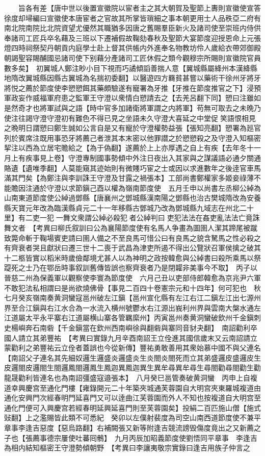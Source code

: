 　　旨各有差【唐中世以後置宣徽院以宦者主之其大朝賀及聖節上夀則宣徽使宣答徐度却埽編曰宣徽使本唐宦者之官故其所掌皆瑣細之事本朝更用士人品秩亞二府有南北院南院比北院資望尤優然其職猶多因唐之舊賜羣臣新火及諸司使至崇班内侍供奉諸司工匠兵卒名藉及三班以下遷補假故鞠劾春秋及聖節大宴節度迎授恩命上元張燈四時祠祭契丹朝貢内庭學士赴上督其供帳内外進奉名物教坊伶人歲給衣帶郊御殿朝謁聖容賜酺國忌諸司使下别藉分產諸司工匠休假之類今觀穆宗所賜則宣徽院官員數多矣】　初翼城人鄭注眇小目下視而巧譎傾謟善揣人意【翼城縣屬絳州本漢絳縣地隋改翼城縣因縣古翼城為名揣初委翻】以醫遊四方羇貧甚嘗以藥術干徐州牙將牙將悦之薦於節度使李愬愬餌其藥頗驗遂有寵署為牙推【牙推在節度推官之下】浸預軍政妄作威福軍府患之監軍王守澄以衆情白愬請去之【去羌呂翻下同】愬曰注雖如是然奇才也將軍試與之語【時中官多加諸衛將軍謂之内將軍】苟無可取去之未晩乃使注往謁守澄守澄初有難色不得已見之坐語未久守澄大喜延之中堂促笑語恨相見之晩明日謂愬曰鄭生誠如公言自是又有寵於守澄權勢益張【張知亮翻】愬署為廵官列於賓席注既用事恐牙將薦己者泄其本末密以他罪譛之於愬愬殺之及守澄入知樞密挈注以西為立居宅贍給之【為于偽翻】遂薦於上上亦厚遇之自上有疾【去年冬十一月上有疾事見上卷】守澄專制國事勢傾中外注日夜出入其家與之謀議語必通夕關通賂遺【遺唯季翻】人莫能窺其迹始則有微賤巧宦之士或因以求進數年之後逹官車馬滿其門矣【為鄭注與李訓誅王守澄及甘露之禍張本】工部尚書鄭權家多姬妾祿薄不能贍因注通於守澄以求節鎭己酉以權為嶺南節度使　五月壬申以尚書左丞柳公綽為山南東道節度使公綽過鄧縣【唐襄州之鄧城縣漢南陽之鄧縣也治古樊城隋改為安養縣天寶元年改為臨漢縣貞元二十一年移縣古鄧城乃改為鄧城縣九域志在州北二十里】有二吏一犯一舞文衆謂公綽必殺犯者公綽判曰吏犯法法在姦吏亂法法亡竟誅舞文者　【考異曰柳氏叙訓曰公為襄陽節度使有名馬人争畫為圖圉人潔其蹄尾被蹴致斃命斬于鞠場賓吏請曰圉人備之不至良馬可惜公曰有良馬之貌含駑馬之性必殺之有齊衰者哭且獻狀曰遷三世十二喪于武昌為津吏所遏不得出公覽狀召軍侯擒之破其十二柩皆實以稻米時歲儉鄰境尤甚人以為神明之政按韓愈與公綽書曰殺所乘馬以祭踶死之士乃在鄂岳時事叙訓舊傳皆誤也察齊衰者乃是閉糶非美事今不取】　丙子以晉慈二州為保義軍以觀察使李寰為節度使　六月己丑以吏部侍郎韓愈為京兆尹六軍不敢犯法私相謂曰是尚欲燒佛骨【事見二百四十卷憲宗元和十四年】何可犯也　秋七月癸亥嶺南奏黄洞蠻寇邕州破左江鎭【邕州宣化縣有左江右江二鎭左江出七源州界至合江鎭與右江水合為一水流入横州號鬱水右江源出峩利州界與雲南大槃水通左江道屬太平永平寨右江道屬横山寨各管羈縻州】丙寅邕州奏黄洞蠻破欽州千金鎭刺史楊嶼奔石南砦【千金鎭當在欽州西南嶼徐與翻砦與寨同音豺夬翻】　南詔勸利卒國人請立其弟豐祐　【考異曰實錄九月辛酉南詔王立佺進其國信歲末又云南詔請立蒙勸利之弟豐祐云立佺者蓋誤也今從新傳】豐祐勇敢善用其衆始慕中國不與父連名【南詔父子連名其先細奴邏生邏盛炎邏盛炎生炎閤炎閤死而立其弟盛邏皮盛邏皮生皮邏閤皮邏閤生閤邏鳳閤邏鳳生鳳迦異鳳迦異生異牟尋異牟尋生尋閤勸尋閤勸生勸龍晟勸利皆連名也為南詔彊盛寇邉張本】　八月癸巳邕管奏破黄洞蠻　丙申上自複道幸興慶宫至通化門樓【雍錄開元二十年築夾城通芙蓉園自大明宫夾東羅城複道由通化安興門次經春明門延喜門又可以逹曲江芙蓉園而外人不知也按複道自大明宫至通化門便可入興慶宫若經春明延興延喜門則至芙蓉園矣】投絹二百匹施山僧【施式䜴翻】上之濫賜皆此類不可悉紀　癸卯以左僕射裴度為司空山南西道節度使不兼平章事李逢吉惡度【惡烏路翻】右補闕張又新等附逢吉競流謗毁傷度竟出之又新薦之子也【張薦事德宗屢使吐蕃囘鶻】　九月丙辰加昭義節度使劉悟同平章事　李逢吉為相内結知樞密王守澄勢傾朝野　【考異曰李讓夷敬宗實錄曰逢吉用族子仲言之